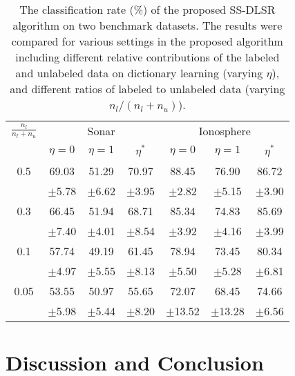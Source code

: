 \documentclass{llncs}
\begin{document}
\begin{table}[t!]
    \caption{The classification rate (\%) of the proposed SS-DLSR algorithm on two benchmark datasets. The results were compared for various settings in the proposed algorithm including different relative contributions of the labeled and unlabeled data on dictionary learning (varying $\eta$), and different ratios of labeled to unlabeled data (varying $n_l/(n_l+n_u)$).}
  \centering
  \label{tab:labUnlabRatioExp}
  \begin{tabular}{|c@{\hskip 0.25in} |c@{\hskip 0.25in} c@{\hskip 0.25in} c@{\hskip 0.25in} |c@{\hskip 0.25in} c@{\hskip 0.25in} c@{\hskip 0.25in} |}
        \hline
        $\frac{n_l}{n_l+n_u}$           & \multicolumn{3}{c|}{Sonar}  & \multicolumn{3}{c|}{Ionosphere}                                              \\  \cline{2-4}  \cline{5-7}
        ~                  & $\eta=0$ & $\eta=1$ & $\eta^*$ & $\eta=0$ & $\eta=1$ & $\eta^*$ \\ \hline \hline
        0.5           & 69.03       & 51.29       & 70.97       & 88.45 & 76.90 & 86.72    \\
        ~             & $\pm$5.78  & $\pm$6.62  & $\pm$3.95  & $\pm$2.82 & $\pm$5.15 & $\pm$3.90       \\
        0.3           & 66.45       & 51.94       & 68.71       & 85.34 & 74.83 & 85.69    \\
        ~             & $\pm$7.40  & $\pm$4.01  & $\pm$8.54  & $\pm$3.92 & $\pm$4.16 & $\pm$3.99     \\
        0.1           & 57.74       & 49.19       & 61.45       & 78.94 & 73.45 & 80.34    \\
        ~             & $\pm$4.97  & $\pm$5.55  & $\pm$8.13  & $\pm$5.50 & $\pm$5.28 & $\pm$6.81     \\
        0.05          & 53.55       & 50.97       & 55.65       & 72.07 & 68.45 & 74.66    \\
        ~             & $\pm$5.98  & $\pm$5.44  & $\pm$8.20  & $\pm$13.52 & $\pm$13.28 & $\pm$6.56     \\
        \hline
    \end{tabular}
\end{table}

\section{Discussion and Conclusion}
\label{sec:disc}
\end{document}
